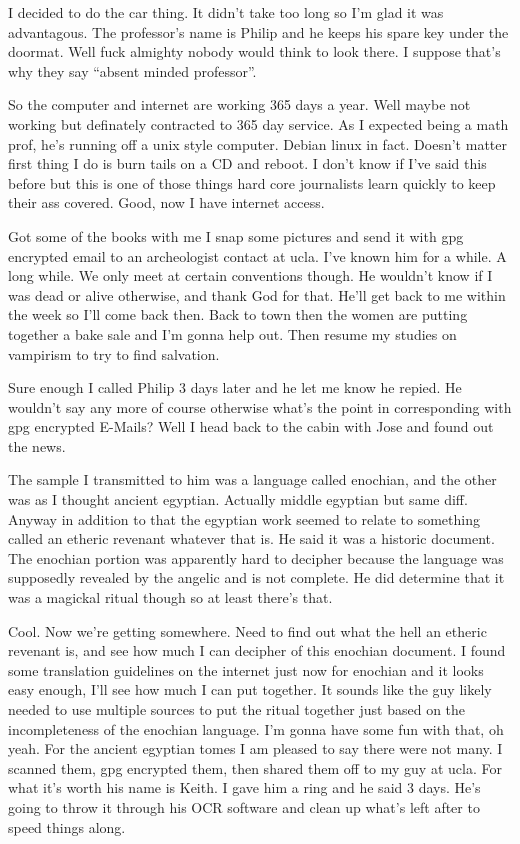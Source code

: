 I decided to do the car thing. It didn't take too long so I'm glad it was advantagous. The professor's name is Philip and he keeps his spare key under the doormat. Well fuck almighty nobody would think to look there. I suppose that's why they say ``absent minded professor''.

So the computer and internet are working 365 days a year. Well maybe not working but definately contracted to 365 day service. As I expected being a math prof, he's running off a unix style computer. Debian linux in fact. Doesn't matter first thing I do is burn tails on a CD and reboot. I don't know if I've said this before but this is one of those things hard core journalists learn quickly to keep their ass covered. Good, now I have internet access.

Got some of the books with me I snap some pictures and send it with gpg encrypted email to an archeologist contact at ucla. I've known him for a while. A long while. We only meet at certain conventions though. He wouldn't know if I was dead or alive otherwise, and thank God for that. He'll get back to me within the week so I'll come back then. Back to town then the women are putting together a bake sale and I'm gonna help out. Then resume my studies on vampirism to try to find salvation.

Sure enough I called Philip 3 days later and he let me know he repied. He wouldn't say any more of course otherwise what's the point in corresponding with gpg encrypted E-Mails? Well I head back to the cabin with Jose and found out the news.

The sample I transmitted to him was a language called enochian, and the other was as I thought ancient egyptian. Actually middle egyptian but same diff. Anyway in addition to that the egyptian work seemed to relate to something called an etheric revenant whatever that is. He said it was a historic document. The enochian portion was apparently hard to decipher because the language was supposedly revealed by the angelic and is not complete. He did determine that it was a magickal ritual though so at least there's that.

Cool. Now we're getting somewhere. Need to find out what the hell an etheric revenant is, and see how much I can decipher of this enochian document. I found some translation guidelines on the internet just now for enochian and it looks easy enough, I'll see how much I can put together. It sounds like the guy likely needed to use multiple sources to put the ritual together just based on the incompleteness of the enochian language. I'm gonna have some fun with that, oh yeah. For the ancient egyptian tomes I am pleased to say there were not many. I scanned them, gpg encrypted them, then shared them off to my guy at ucla. For what it's worth his name is Keith. I gave him a ring and he said 3 days. He's going to throw it through his OCR software and clean up what's left after to speed things along.

